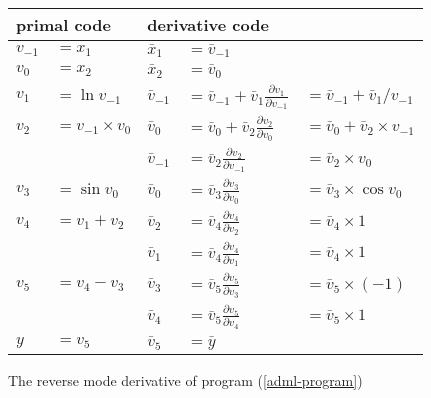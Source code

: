 \documentclass[12pt]{article}
\begin{document}
  \newcommand{\diff}[2]{
    \bar{v}_{#1} \frac{\partial v_{#1}}{\partial v_{#2}}
  }

\begin{figure}[t]
\center
\begin{tabular}[t]{ll|lll}

  \multicolumn{2}{l|}{primal code}
  &
  \multicolumn{3}{l}{derivative code}
  \\

  \hline

  $v_{-1}$ & $= x_1$
  &
  $\bar{x}_1$ & $= \bar{v}_{-1}$
  \\
  
  $v_{0}$ & $= x_2$
  &
  $\bar{x}_2$ & $= \bar{v}_{0}$
  \\

  \hline

  $v_1$ & $= \ln{v_{-1}}$
  &
  \(\bar{v}_{-1}\)
  &
  \(= \bar{v}_{-1} + \diff{1}{-1}\)
  &
  \(= \bar{v}_{-1} + \bar{v}_1 / v_{-1}
  \) \\

  $v_2$ & $= v_{-1} \times v_0$
  &
  \(\bar{v}_0\)
  &
  \(= \bar{v}_0 + \diff{2}{0}\)
  &
  \(= \bar{v}_0 + \bar{v}_2 \times v_{-1}
  \) \\

  &
  &
  \(\bar{v}_{-1}\)
  &
  \(= \diff{2}{-1}\)
  &
  \(
  = \bar{v}_2 \times v_{0}
  \) \\

  $v_3$ & $= \sin{v_0}$
  &
  \(\bar{v}_0\)
  &
  \(= \diff{3}{0}\)
  &
  \(
  = \bar{v}_3 \times \cos v_0
  \) \\

  $v_4$ & $= v_1 + v_2$
  &
  \(\bar{v}_2\)
  &
  \(= \diff{4}{2}\)
  &
  \(
  = \bar{v}_4 \times 1
  \) \\

  &
  &
  \(\bar{v}_1\)
  &
  \(= \diff{4}{1}\)
  &
  \(
  = \bar{v}_4 \times 1
  \) \\

  $v_5$ & $= v_4 - v_3$
  &
  \(\bar{v}_3\)
  &
  \(= \diff{5}{3}\)
  &
  \(
  = \bar{v}_5 \times (-1)
  \) \\
  
  &
  &
  \(\bar{v}_4\)
  &
  \(= \diff{5}{4}\)
  &
  \(
  = \bar{v}_5 \times 1
  \) \\
  
  \hline

  $y$ & $= v_5$
  &
  $\bar{v}_5$ & $= \bar{y}$
  \\

\end{tabular}
\caption{\label{adml-diff} The reverse mode derivative of program
  (\ref{adml-program})}
\end{figure}
\end{document}
